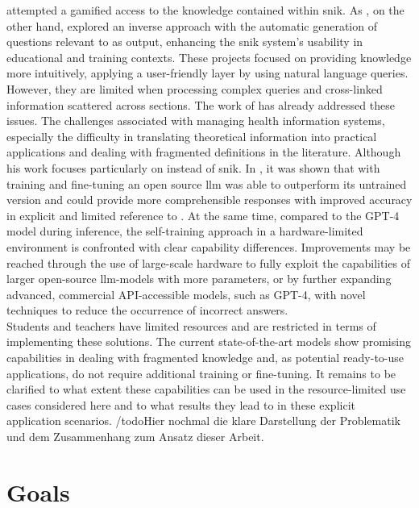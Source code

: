\citet{snikquiz} attempted a gamified access to the knowledge contained within \ac{snik}. 
As \citet{arneba}, on the other hand, explored an inverse approach with the automatic generation of questions relevant to \citep{snikquiz} as output, enhancing the \ac{snik} system's usability in educational and training contexts.
These projects focused on providing knowledge more intuitively, applying a user-friendly layer by using natural language queries.
%
However, they are limited when processing complex queries and cross-linked information scattered across sections.
The work of \citet{Paul_Keller} has already addressed these issues. 
The challenges associated with managing health information systems, especially the difficulty in translating theoretical information into practical applications and dealing with fragmented definitions in the literature.
Although his work focuses particularly on \citet{bb2} instead of \ac{snik}.
%
In \citet{Paul_Keller}, it was shown that with training and fine-tuning an open source \ac{llm} was able to outperform its untrained version and could provide more comprehensible responses with improved accuracy in explicit and limited reference to \citet{bb2}.
At the same time, compared to the GPT-4 model during inference, the self-training approach in a hardware-limited environment is confronted with clear capability differences.
%
Improvements may be reached through the use of large-scale hardware to fully exploit the capabilities of larger open-source \ac{llm}-models with more parameters, or by further expanding advanced, commercial API-accessible models, such as GPT-4, with novel techniques to reduce the occurrence of incorrect answers.\\
%
Students and teachers have limited resources and are restricted in terms of implementing these solutions.
The current state-of-the-art models show promising capabilities in dealing with fragmented knowledge and, as potential ready-to-use applications, do not require additional training or fine-tuning. 
It remains to be clarified to what extent these capabilities can be used in the resource-limited use cases considered here and to what results they lead to in these explicit application scenarios.
/todo{Hier nochmal die klare Darstellung der Problematik und dem Zusammenhang zum Ansatz dieser Arbeit.}
%

\section{Goals}\label{sec:goals}

